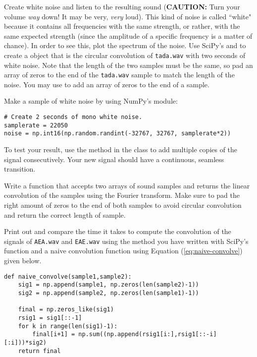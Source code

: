 Create white noise and listen to the resulting sound (\textbf{CAUTION:} Turn your volume \emph{way} down! It may be very, \emph{very} loud).
This kind of noise is called ``white" because it contains all frequencies with the same strength, or rather, with the same expected strength (since the amplitude of a specific frequency is a matter of chance).
In order to see this, plot the spectrum of the noise.
Use SciPy's  and  to create a  object that is the circular convolution of \texttt{tada.wav} with two seconds of white noise.
Note that the length of the two samples must be the same, so pad an array of zeros to the end of the \texttt{tada.wav} sample to match the length of the noise. 
You may use  to add an array of zeros to the end of a sample. 

Make a sample of white noise by using NumPy's  module:
\begin{lstlisting}
# Create 2 seconds of mono white noise.
samplerate = 22050
noise = np.int16(np.random.randint(-32767, 32767, samplerate*2))
\end{lstlisting} 

To test your result, use the  method in the  class to add multiple copies of the signal consecutively. 
Your new signal should have a continuous, seamless transition. 

Write a function that accepts two arrays of sound samples and returns the linear convolution of the samples using the Fourier transform. 
Make sure to pad the right amount of zeros to the end of both samples to avoid circular convolution and return the correct length of sample. 

Print out and compare the time it takes to compute the convolution of the signals of \texttt{AEA.wav} and \texttt{EAE.wav} using the method you have written with SciPy's  function and a naive convolution function using Equation (\ref{eq:naive-convolve}) given below.  
 
\begin{lstlisting}
def naive_convolve(sample1,sample2):
    sig1 = np.append(sample1, np.zeros(len(sample2)-1))
    sig2 = np.append(sample2, np.zeros(len(sample1)-1))
    
    final = np.zeros_like(sig1)
    rsig1 = sig1[::-1]
    for k in range(len(sig1)-1):
        final[i+1] = np.sum((np.append(rsig1[i:],rsig1[::-i][:i]))*sig2)
    return final    
\end{lstlisting}

